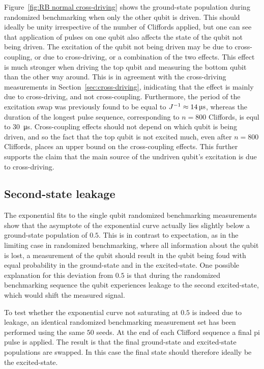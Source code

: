         Figure~\ref{fig:RB normal cross-driving} shows the ground-state population during randomized benchmarking when only the other qubit is driven. This should ideally be unity irrespective of the number of Cliffords applied, but one can see that application of pulses on one qubit also affects the state of the qubit not being driven. The excitation of the qubit not being driven may be due to cross-coupling, or due to cross-driving, or a combination of the two effects. This effect is much stronger when driving the top qubit and measuring the bottom qubit than the other way around. This is in agreement with the cross-driving measurements in Section~\ref{sec:cross-driving}, inidicating that the effect is mainly due to cross-driving, and not cross-coupling. Furthermore, the period of the excitation swap was previously found to be equal to $J^{-1} \approx \text{\ensuremath{\SI{14}{\micro \second}}}$, whereas the duration of the longest pulse sequence, corresponding to $n=800$ Cliffords, is equl to \SI{30}{\micro \second}. Cross-coupling effects should not depend on which qubit is being driven, and so the fact that the top qubit is not excited much, even after $n=800$ Cliffords, places an upper bound on the cross-coupling effects. This further supports the claim that the main source of the undriven qubit's excitation is due to cross-driving.

      \subsection{Second-state leakage}
        \label{ssec:Second-state leakage}
        The exponential fits to the single qubit randomized benchmarking measurements show that the asymptote of the exponential curve actually lies slightly below a ground-state population of $0.5$. This is in contrast to expectation, as in the limiting case in randomized benchmarking, where all information about the qubit is lost, a measurement of the qubit should result in the qubit being foud with equal probability in the ground-state and in the excited-state. One possible explanation for this deviation from $0.5$ is that during the randomized benchmarking sequence the qubit experiences leakage to the second excited-state, which would shift the measured signal.

        To test whether the exponential curve not saturating at $0.5$ is indeed due to leakage, an identical randomized benchmarking measurement set has been performed using the same $50$ seeds. At the end of each Clifford sequence a final pi pulse is applied. The result is that the final ground-state and excited-state populations are swapped. In this case the final state should therefore ideally be the excited-state.

